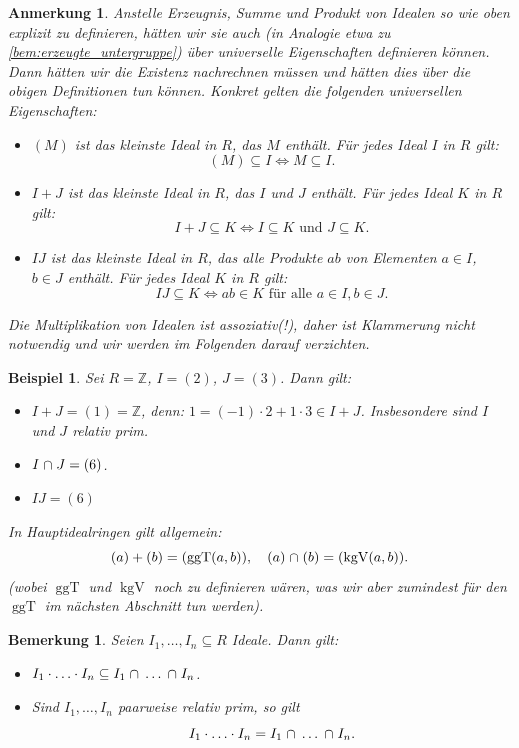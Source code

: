 \documentclass[a4paper, twoside, 11pt, ngerman]{report}
\newcommand{\ZZ}{\mathds Z}
\DeclareMathOperator{\ggT}{ggT}
\DeclareMathOperator{\kgV}{kgV}
\renewcommand{\cap}{\;\rotatebox{90}{\reflectbox{\rotatebox{270}{$\cup$}}}\;}
\theoremstyle{definistyle}
\newtheorem{bem}[satz]{Bemerkung}
\newtheorem{anm}[satz]{Anmerkung}
\newtheorem{bsp}[satz]{Beispiel}
\theoremstyle{remark}
\begin{document}
\begin{anm}\label{anm:kleinstes_ideal}
Anstelle Erzeugnis, Summe und Produkt von Idealen so wie oben explizit zu definieren,
hätten wir sie auch (in Analogie etwa zu \ref{bem:erzeugte_untergruppe}) über universelle Eigenschaften definieren können. Dann hätten wir die Existenz nachrechnen müssen und hätten dies
über die obigen Definitionen tun können. Konkret gelten die folgenden universellen Eigenschaften:
\begin{itemize}
    \item $(M)$ ist das kleinste Ideal in $R$, das $M$ enthält. Für jedes Ideal $I$ in $R$ gilt:
    \[(M) \subseteq I \iff M \subseteq I.\]
    \item $I + J$ ist das kleinste Ideal in $R$, das $I$ und $J$ enthält. Für jedes Ideal $K$ in $R$ gilt:
    \[I + J \subseteq K \iff I \subseteq K \text{ und } J \subseteq K.\]
    \item $I J$ ist das kleinste Ideal in $R$, das alle Produkte $ab$ von Elementen $a \in I$, $b \in J$ enthält.
    Für jedes Ideal $K$ in $R$ gilt:
    \[
    I J \subseteq K \iff ab \in K \text{ für alle } a \in I, b \in J.
    \]
\end{itemize}
Die Multiplikation von Idealen ist assoziativ(!), daher ist Klammerung nicht notwendig und wir werden im Folgenden darauf verzichten.
\end{anm}

\begin{bsp}\label{bsp:idealsummen_produkte}
Sei $R = \ZZ$, $I = (2)$, $J = (3)$. Dann gilt:
\begin{itemize}
    \item $I + J = (1) = \ZZ$, denn: $1 = (-1) \cdot 2 + 1 \cdot 3 \in I + J$. Insbesondere sind $I$ und $J$ relativ prim.
    \item $I \cap J = (6)$.
    \item $IJ=(6)$
\end{itemize}

In Hauptidealringen gilt allgemein:
\[
(a) + (b) = (\ggT(a, b)), \quad (a) \cap (b) = (\kgV(a, b)).
\]
(wobei $\ggT$ und $\kgV$ noch zu definieren wären, was wir aber zumindest für den $\ggT$ im nächsten Abschnitt tun werden).
\end{bsp}

\begin{bem}\label{bem:idealprodukte_durchschnitte}
Seien $I_1, \dots, I_n \subseteq R$ Ideale. Dann gilt:
\begin{itemize}
    \item[(a)] $I_1 \cdot\ldots\cdot I_n \subseteq I_1 \cap \dots \cap I_n$.
    \item[(b)] Sind $I_1, \dots, I_n$ paarweise relativ prim, so gilt
    \[
    I_1 \cdot\ldots\cdot I_n = I_1 \cap \dots \cap I_n.
    \]
\end{itemize}
\end{bem}
\end{document}
